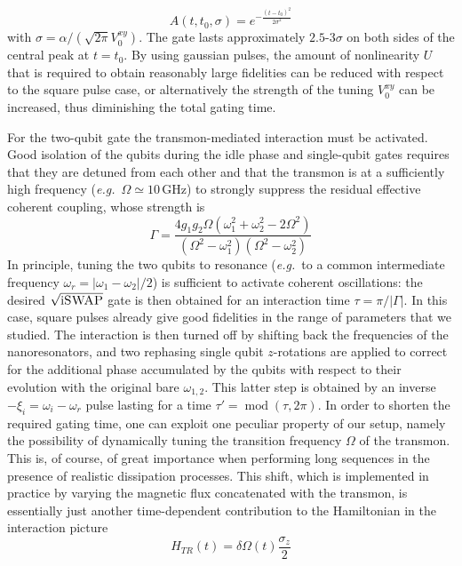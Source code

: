 \documentclass[aps,twocolumn,groupedaddress,superscriptaddress,floatfix,amsmath,amssymb,prb]{revtex4-1}
\begin{document}
\begin{equation}
A(t,t_0, \sigma) = e^{-\frac{(t-t_0)^2}{2\sigma^2}}
\end{equation}
with $\sigma = \alpha/(\sqrt{2\pi} V^{xy}_0)$. The gate lasts approximately $2.5$-$3\sigma$ on both sides of the central peak at $t=t_0$. By using gaussian pulses, the amount of nonlinearity $U$ that is required to obtain reasonably large fidelities can be reduced with respect to the square pulse case, or alternatively the strength of the tuning $V^{xy}_0$ can be increased, thus diminishing the total gating time.

For the two-qubit gate the transmon-mediated interaction must be activated. Good isolation of the qubits during the idle phase and single-qubit gates requires that they are detuned from each other and that the transmon is at a sufficiently high frequency (\textit{e.g.}\ $\Omega\simeq10\,$GHz) to strongly suppress the residual effective coherent coupling, whose strength is
\begin{equation}
\Gamma = \frac{4 g_1 g_2 \Omega(\omega_1^2 + \omega_2^2 -2\Omega^2)}{(\Omega^2 - \omega_1^2)(\Omega^2 - \omega_2^2)}
\label{eq:Gamma}
\end{equation}
In principle, tuning the two qubits to resonance (\textit{e.g.}\ to a common intermediate frequency $\omega_r = |\omega_1 - \omega_2|/2$) is sufficient to activate coherent oscillations: the desired $\sqrt{\text{i\textsc{SWAP}}}$ gate is then obtained for an interaction time $\tau = \pi/|\Gamma|$. In this case, square pulses already give good fidelities in the range of parameters that we studied. The interaction is then turned off by shifting back the frequencies of the nanoresonators, and two rephasing single qubit $z$-rotations are applied to correct for the additional phase accumulated by the qubits with respect to their evolution with the original bare $\omega_{1,2}$. This latter step is obtained by an inverse $-\xi_i = \omega_i - \omega_r$ pulse lasting for a time $\tau'= \operatorname{mod}(\tau ,2\pi)$. In order to shorten the required gating time, one can exploit one peculiar property of our setup, namely the possibility of dynamically tuning the transition frequency $\Omega$ of the transmon. This is, of course, of great importance when performing long sequences in the presence of realistic dissipation processes. This shift, which is implemented in practice by varying the magnetic flux concatenated with the transmon, is essentially just another time-dependent contribution to the Hamiltonian in the interaction picture
\begin{equation}
H_{TR}(t) = \delta\Omega(t) \frac{\sigma_z}{2}
\end{equation}
\end{document}
